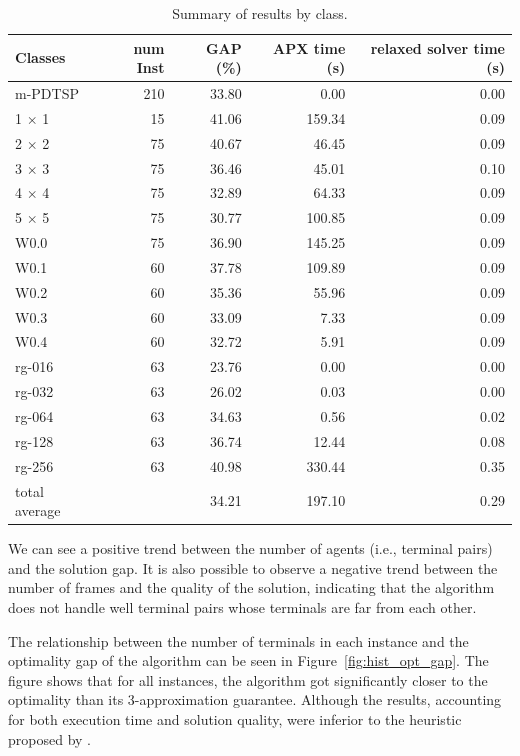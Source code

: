 \begin{table}[H]
\caption{Summary of results by class.}
\centering
    \begin{tabular}{lrrrr}
        \toprule
        Classes & num Inst & GAP (\%) & APX time (s) & relaxed solver time (s) \\
        \midrule
        m-PDTSP & 210 & 33.80 & 0.00 & 0.00 \\
        \hline
        1 $\times$ 1 & 15 & 41.06 & 159.34 & 0.09 \\
        2 $\times$ 2 & 75 & 40.67 & 46.45 & 0.09 \\
        3 $\times$ 3 & 75 & 36.46 & 45.01 & 0.10 \\
        4 $\times$ 4 & 75 & 32.89 & 64.33 & 0.09 \\
        5 $\times$ 5 & 75 & 30.77 & 100.85 & 0.09 \\
        \hline
        W0.0 & 75 & 36.90 & 145.25 & 0.09 \\
        W0.1 & 60 & 37.78 & 109.89 & 0.09 \\
        W0.2 & 60 & 35.36 & 55.96 & 0.09 \\
        W0.3 & 60 & 33.09 & 7.33 & 0.09 \\
        W0.4 & 60 & 32.72 & 5.91 & 0.09 \\
        \hline
        rg-016 & 63 & 23.76 & 0.00 & 0.00 \\
        rg-032 & 63 & 26.02 & 0.03 & 0.00 \\
        rg-064 & 63 & 34.63 & 0.56 & 0.02 \\
        rg-128 & 63 & 36.74 & 12.44 & 0.08 \\
        rg-256 & 63 & 40.98 & 330.44 & 0.35 \\
        \hline
        total average & & 34.21 & 197.10  & 0.29 \\
        \bottomrule
    \end{tabular}
\label{table_avg_apx}
\end{table}


We can see a positive trend between the number of agents (i.e., terminal pairs) and the solution gap. It is also possible to observe a negative trend between the number of frames and the quality of the solution, indicating that the algorithm does not handle well terminal pairs whose terminals are far from each other.

The relationship between the number of terminals in each instance and the optimality gap of the algorithm can be seen in Figure~\ref{fig:hist_opt_gap}. The figure shows that for all instances, the algorithm got significantly closer to the optimality than its 3-approximation guarantee. Although the results, accounting for both execution time and solution quality, were inferior to the heuristic proposed by \cite{Pereira2018TheSM}. 

